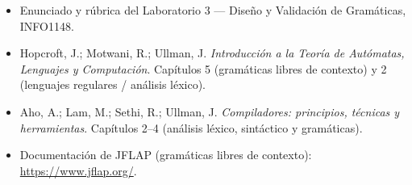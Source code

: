 \documentclass[11pt,letterpaper]{article}
\begin{document}
\begin{itemize}
  \item Enunciado y rúbrica del Laboratorio 3 --- Diseño y Validación de Gramáticas, INFO1148.
  \item Hopcroft, J.; Motwani, R.; Ullman, J. \emph{Introducción a la Teoría de Autómatas, Lenguajes y
        Computación}. Capítulos 5 (gramáticas libres de contexto) y 2 (lenguajes regulares / análisis léxico).
  \item Aho, A.; Lam, M.; Sethi, R.; Ullman, J. \emph{Compiladores: principios, técnicas y herramientas}.
        Capítulos 2--4 (análisis léxico, sintáctico y gramáticas).
  \item Documentación de JFLAP (gramáticas libres de contexto): \url{https://www.jflap.org/}.
\end{itemize}
\end{document}
